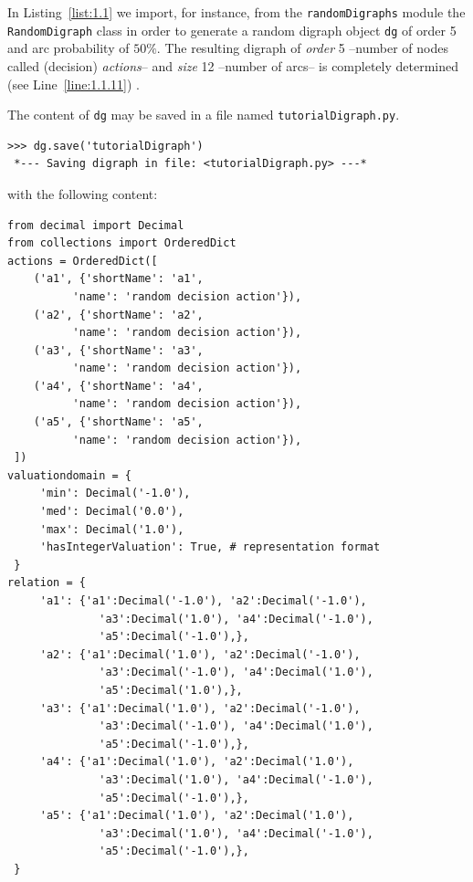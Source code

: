 In Listing~\vref{list:1.1}  we import, for instance, from the \texttt{randomDigraphs} module the \texttt{RandomDigraph} class  in order to generate a random digraph object \texttt{dg} of order 5 and arc probability of $50\%$. The resulting digraph of \emph{order} 5 --number of nodes called (decision) \emph{actions}-- and \emph{size} 12 --number of arcs-- is completely determined (see Line~\ref{line:1.1.11}) .

The content of \texttt{dg} may be saved in a file named \texttt{tutorialDigraph.py}.
\begin{lstlisting}
>>> dg.save('tutorialDigraph')
 *--- Saving digraph in file: <tutorialDigraph.py> ---*
\end{lstlisting}
with the following content:
\begin{lstlisting}[caption={A stored digraph instance},label=list:1.2]
from decimal import Decimal
from collections import OrderedDict
actions = OrderedDict([
    ('a1', {'shortName': 'a1',
          'name': 'random decision action'}),
    ('a2', {'shortName': 'a2',
          'name': 'random decision action'}),
    ('a3', {'shortName': 'a3',
          'name': 'random decision action'}),
    ('a4', {'shortName': 'a4',
          'name': 'random decision action'}),
    ('a5', {'shortName': 'a5',
          'name': 'random decision action'}),
 ])
valuationdomain = {
     'min': Decimal('-1.0'),
     'med': Decimal('0.0'),
     'max': Decimal('1.0'),
     'hasIntegerValuation': True, # representation format
 }
relation = {
     'a1': {'a1':Decimal('-1.0'), 'a2':Decimal('-1.0'),
              'a3':Decimal('1.0'), 'a4':Decimal('-1.0'),
              'a5':Decimal('-1.0'),},
     'a2': {'a1':Decimal('1.0'), 'a2':Decimal('-1.0'),
              'a3':Decimal('-1.0'), 'a4':Decimal('1.0'),
              'a5':Decimal('1.0'),},
     'a3': {'a1':Decimal('1.0'), 'a2':Decimal('-1.0'),
              'a3':Decimal('-1.0'), 'a4':Decimal('1.0'),
              'a5':Decimal('-1.0'),},
     'a4': {'a1':Decimal('1.0'), 'a2':Decimal('1.0'),
              'a3':Decimal('1.0'), 'a4':Decimal('-1.0'),
              'a5':Decimal('-1.0'),},
     'a5': {'a1':Decimal('1.0'), 'a2':Decimal('1.0'),
              'a3':Decimal('1.0'), 'a4':Decimal('-1.0'),
              'a5':Decimal('-1.0'),},
 }
\end{lstlisting}

